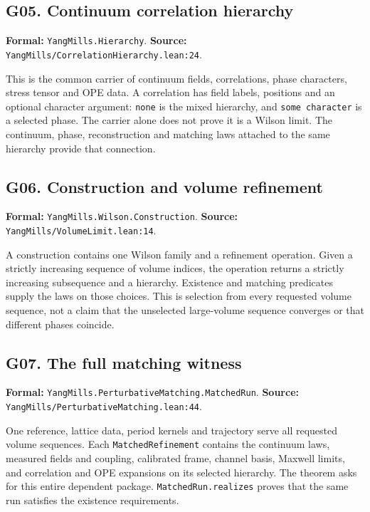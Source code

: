 \documentclass[11pt]{article}
\newcommand{\code}[1]{{\small\nolinkurl{#1}}}
\begin{document}
\subsection*{G05. Continuum correlation hierarchy}
\label{gloss:G05}
\textbf{Formal:} \code{YangMills.Hierarchy}.\newline
\textbf{Source:} \code{YangMills/CorrelationHierarchy.lean:24}.

This is the common carrier of continuum fields, correlations, phase
characters, stress tensor and OPE data. A correlation has field labels,
positions and an optional character argument: \code{none} is the mixed
hierarchy, and \code{some character} is a selected phase. The carrier alone
does not prove it is a Wilson limit. The continuum, phase, reconstruction
and matching laws attached to the same hierarchy provide that connection.

\subsection*{G06. Construction and volume refinement}
\label{gloss:G06}
\textbf{Formal:} \code{YangMills.Wilson.Construction}.\newline
\textbf{Source:} \code{YangMills/VolumeLimit.lean:14}.

A construction contains one Wilson family and a refinement operation.
Given a strictly increasing sequence of volume indices, the operation
returns a strictly increasing subsequence and a hierarchy. Existence and
matching predicates supply the laws on those choices. This is selection
from every requested volume sequence, not a claim that the unselected
large-volume sequence converges or that different phases coincide.

\subsection*{G07. The full matching witness}
\label{gloss:G07}
\textbf{Formal:} \code{YangMills.PerturbativeMatching.MatchedRun}.\newline
\textbf{Source:} \code{YangMills/PerturbativeMatching.lean:44}.

One reference, lattice data, period kernels and trajectory serve all
requested volume sequences. Each \code{MatchedRefinement} contains the
continuum laws, measured fields and coupling, calibrated frame, channel
basis, Maxwell limits, and correlation and OPE expansions on its selected
hierarchy. The theorem asks for this entire dependent package.
\code{MatchedRun.realizes} proves that the same run satisfies the existence
requirements.
\end{document}
